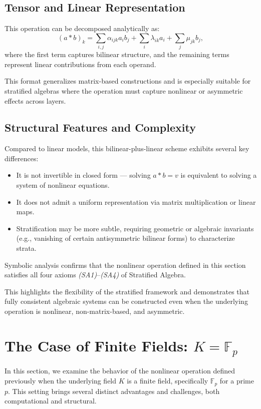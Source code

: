 \documentclass[12pt]{article}
\theoremstyle{definition}
\theoremstyle{plain}
\theoremstyle{remark}
\begin{document}
\subsection{Tensor and Linear Representation}

This operation can be decomposed analytically as:
\[
(a * b)_k = \sum_{i,j} \alpha_{ijk} a_i b_j + \sum_i \lambda_{ik} a_i + \sum_j \mu_{jk} b_j,
\]
where the first term captures bilinear structure, and the remaining terms represent linear contributions from each operand.

This format generalizes matrix-based constructions and is especially suitable for stratified algebras where the operation must capture nonlinear or asymmetric effects across layers.

\subsection{Structural Features and Complexity}

Compared to linear models, this bilinear-plus-linear scheme exhibits several key differences:
\begin{itemize}
    \item It is not invertible in closed form — solving \( a * b = v \) is equivalent to solving a system of nonlinear equations.
    \item It does not admit a uniform representation via matrix multiplication or linear maps.
    \item Stratification may be more subtle, requiring geometric or algebraic invariants (e.g., vanishing of certain antisymmetric bilinear forms) to characterize strata.
\end{itemize}

Symbolic analysis confirms that the nonlinear operation defined in this section satisfies all four axioms \emph{(SA1)}–\emph{(SA4)} of Stratified Algebra.

This highlights the flexibility of the stratified framework and demonstrates that fully consistent algebraic systems can be constructed even when the underlying operation is nonlinear, non-matrix-based, and asymmetric.

\section{The Case of Finite Fields: \texorpdfstring{$K = \mathbb{F}_p$}{K = Fp}}

In this section, we examine the behavior of the nonlinear operation defined previously when the underlying field \( K \) is a finite field, specifically \( \mathbb{F}_p \) for a prime \( p \). This setting brings several distinct advantages and challenges, both computational and structural.
\end{document}
